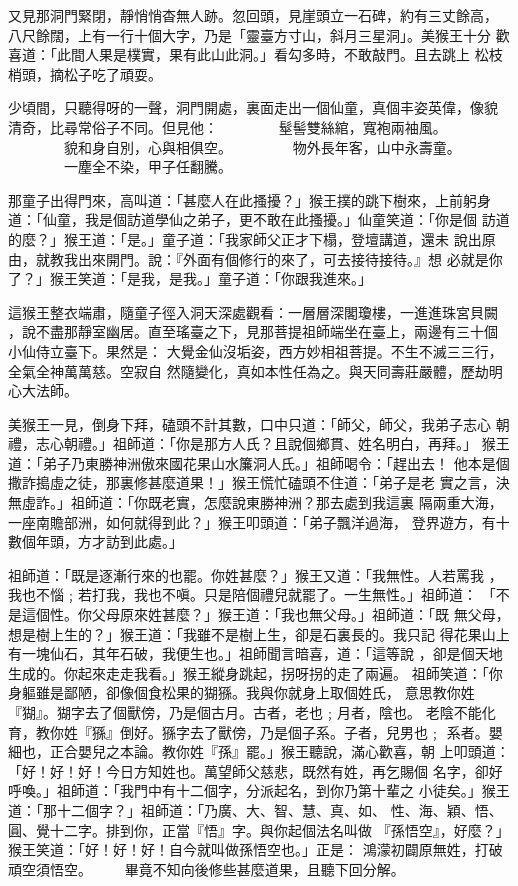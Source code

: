 \begin{pinyinscope}
{又見那洞門緊閉，靜悄悄杳無人跡。忽回頭，見崖頭立一石碑，約有三丈餘高，
八尺餘闊，上有一行十個大字，乃是「靈臺方寸山，斜月三星洞」。美猴王十分
歡喜道：「此間人果是樸實，果有此山此洞。」看勾多時，不敢敲門。且去跳上
松枝梢頭，摘松子吃了頑耍。

少頃間，只聽得呀的一聲，洞門開處，裏面走出一個仙童，真個丰姿英偉，像貌
清奇，比尋常俗子不同。但見他：
　　　　髽髻雙絲綰，寬袍兩袖風。
　　　　貌和身自別，心與相俱空。
　　　　物外長年客，山中永壽童。
　　　　一塵全不染，甲子任翻騰。

那童子出得門來，高叫道：「甚麼人在此搔擾？」猴王撲的跳下樹來，上前躬身
道：「仙童，我是個訪道學仙之弟子，更不敢在此搔擾。」仙童笑道：「你是個
訪道的麼？」猴王道：「是。」童子道：「我家師父正才下榻，登壇講道，還未
說出原由，就教我出來開門。說：『外面有個修行的來了，可去接待接待。』想
必就是你了？」猴王笑道：「是我，是我。」童子道：「你跟我進來。」

這猴王整衣端肅，隨童子徑入洞天深處觀看：一層層深閣瓊樓，一進進珠宮貝闕
，說不盡那靜室幽居。直至瑤臺之下，見那菩提祖師端坐在臺上，兩邊有三十個
小仙侍立臺下。果然是：
大覺金仙沒垢姿，西方妙相祖菩提。不生不滅三三行，全氣全神萬萬慈。空寂自
然隨變化，真如本性任為之。與天同壽莊嚴體，歷劫明心大法師。

美猴王一見，倒身下拜，磕頭不計其數，口中只道：「師父，師父，我弟子志心
朝禮，志心朝禮。」祖師道：「你是那方人氏？且說個鄉貫、姓名明白，再拜。」
猴王道：「弟子乃東勝神洲傲來國花果山水簾洞人氏。」祖師喝令：「趕出去！
他本是個撒詐搗虛之徒，那裏修甚麼道果！」猴王慌忙磕頭不住道：「弟子是老
實之言，決無虛詐。」祖師道：「你既老實，怎麼說東勝神洲？那去處到我這裏
隔兩重大海，一座南贍部洲，如何就得到此？」猴王叩頭道：「弟子飄洋過海，
登界遊方，有十數個年頭，方才訪到此處。」

祖師道：「既是逐漸行來的也罷。你姓甚麼？」猴王又道：「我無性。人若罵我
，我也不惱﹔若打我，我也不嗔。只是陪個禮兒就罷了。一生無性。」祖師道：
「不是這個性。你父母原來姓甚麼？」猴王道：「我也無父母。」祖師道：「既
無父母，想是樹上生的？」猴王道：「我雖不是樹上生，卻是石裏長的。我只記
得花果山上有一塊仙石，其年石破，我便生也。」祖師聞言暗喜，道：「這等說
，卻是個天地生成的。你起來走走我看。」猴王縱身跳起，拐呀拐的走了兩遍。
祖師笑道：「你身軀雖是鄙陋，卻像個食松果的猢猻。我與你就身上取個姓氏，
意思教你姓『猢』。猢字去了個獸傍，乃是個古月。古者，老也﹔月者，陰也。
老陰不能化育，教你姓『猻』倒好。猻字去了獸傍，乃是個子系。子者，兒男也﹔
系者。嬰細也，正合嬰兒之本論。教你姓『孫』罷。」猴王聽說，滿心歡喜，朝
上叩頭道：「好！好！好！今日方知姓也。萬望師父慈悲，既然有姓，再乞賜個
名字，卻好呼喚。」祖師道：「我門中有十二個字，分派起名，到你乃第十輩之
小徒矣。」猴王道：「那十二個字？」祖師道：「乃廣、大、智、慧、真、如、
性、海、穎、悟、圓、覺十二字。排到你，正當『悟』字。與你起個法名叫做
『孫悟空』，好麼？」猴王笑道：「好！好！好！自今就叫做孫悟空也。」正是：
    鴻濛初闢原無姓，打破頑空須悟空。
　　畢竟不知向後修些甚麼道果，且聽下回分解。





}
\end{pinyinscope}
